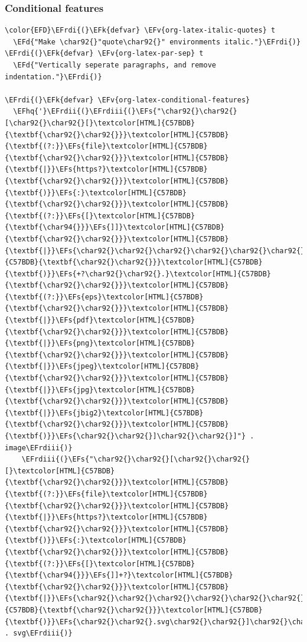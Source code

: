 \documentclass{scrartcl}
\newcommand{\EFk}[1]{\textcolor{EFk}{#1}} %
\newcommand{\EFd}[1]{\textcolor{EFd}{#1}} %
\newcommand{\EFs}[1]{\textcolor{EFs}{#1}} %
\newcommand{\EFv}[1]{\textcolor{EFv}{#1}} %
\newcommand{\EFhq}[1]{#1} %
\newcommand{\EFrdi}[1]{#1} %
\newcommand{\EFrdii}[1]{#1} %
\newcommand{\EFrdiii}[1]{#1} %
\begin{document}
\subsubsection{Conditional features}
\label{sec:org7ec41a1}
\begin{Code}
\begin{Verbatim}[]
\color{EFD}\EFrdi{(}\EFk{defvar} \EFv{org-latex-italic-quotes} t
  \EFd{"Make \char92{}"quote\char92{}" environments italic."}\EFrdi{)}
\EFrdi{(}\EFk{defvar} \EFv{org-latex-par-sep} t
  \EFd{"Vertically seperate paragraphs, and remove indentation."}\EFrdi{)}

\EFrdi{(}\EFk{defvar} \EFv{org-latex-conditional-features}
  \EFhq{'}\EFrdii{(}\EFrdiii{(}\EFs{"\char92{}\char92{}[\char92{}\char92{}[}\textcolor[HTML]{C57BDB}{\textbf{\char92{}\char92{}}}\textcolor[HTML]{C57BDB}{\textbf{(?:}}\EFs{file}\textcolor[HTML]{C57BDB}{\textbf{\char92{}\char92{}}}\textcolor[HTML]{C57BDB}{\textbf{|}}\EFs{https?}\textcolor[HTML]{C57BDB}{\textbf{\char92{}\char92{}}}\textcolor[HTML]{C57BDB}{\textbf{)}}\EFs{:}\textcolor[HTML]{C57BDB}{\textbf{\char92{}\char92{}}}\textcolor[HTML]{C57BDB}{\textbf{(?:}}\EFs{[}\textcolor[HTML]{C57BDB}{\textbf{\char94{}}}\EFs{]]}\textcolor[HTML]{C57BDB}{\textbf{\char92{}\char92{}}}\textcolor[HTML]{C57BDB}{\textbf{|}}\EFs{\char92{}\char92{}\char92{}\char92{}\char92{}\char92{}]}\textcolor[HTML]{C57BDB}{\textbf{\char92{}\char92{}}}\textcolor[HTML]{C57BDB}{\textbf{)}}\EFs{+?\char92{}\char92{}.}\textcolor[HTML]{C57BDB}{\textbf{\char92{}\char92{}}}\textcolor[HTML]{C57BDB}{\textbf{(?:}}\EFs{eps}\textcolor[HTML]{C57BDB}{\textbf{\char92{}\char92{}}}\textcolor[HTML]{C57BDB}{\textbf{|}}\EFs{pdf}\textcolor[HTML]{C57BDB}{\textbf{\char92{}\char92{}}}\textcolor[HTML]{C57BDB}{\textbf{|}}\EFs{png}\textcolor[HTML]{C57BDB}{\textbf{\char92{}\char92{}}}\textcolor[HTML]{C57BDB}{\textbf{|}}\EFs{jpeg}\textcolor[HTML]{C57BDB}{\textbf{\char92{}\char92{}}}\textcolor[HTML]{C57BDB}{\textbf{|}}\EFs{jpg}\textcolor[HTML]{C57BDB}{\textbf{\char92{}\char92{}}}\textcolor[HTML]{C57BDB}{\textbf{|}}\EFs{jbig2}\textcolor[HTML]{C57BDB}{\textbf{\char92{}\char92{}}}\textcolor[HTML]{C57BDB}{\textbf{)}}\EFs{\char92{}\char92{}]\char92{}\char92{}]"} . image\EFrdiii{)}
    \EFrdiii{(}\EFs{"\char92{}\char92{}[\char92{}\char92{}[}\textcolor[HTML]{C57BDB}{\textbf{\char92{}\char92{}}}\textcolor[HTML]{C57BDB}{\textbf{(?:}}\EFs{file}\textcolor[HTML]{C57BDB}{\textbf{\char92{}\char92{}}}\textcolor[HTML]{C57BDB}{\textbf{|}}\EFs{https?}\textcolor[HTML]{C57BDB}{\textbf{\char92{}\char92{}}}\textcolor[HTML]{C57BDB}{\textbf{)}}\EFs{:}\textcolor[HTML]{C57BDB}{\textbf{\char92{}\char92{}}}\textcolor[HTML]{C57BDB}{\textbf{(?:}}\EFs{[}\textcolor[HTML]{C57BDB}{\textbf{\char94{}}}\EFs{]]+?}\textcolor[HTML]{C57BDB}{\textbf{\char92{}\char92{}}}\textcolor[HTML]{C57BDB}{\textbf{|}}\EFs{\char92{}\char92{}\char92{}\char92{}\char92{}\char92{}]}\textcolor[HTML]{C57BDB}{\textbf{\char92{}\char92{}}}\textcolor[HTML]{C57BDB}{\textbf{)}}\EFs{\char92{}\char92{}.svg\char92{}\char92{}]\char92{}\char92{}]"} . svg\EFrdiii{)}

\end{Verbatim}
\end{Code}
\end{document}
